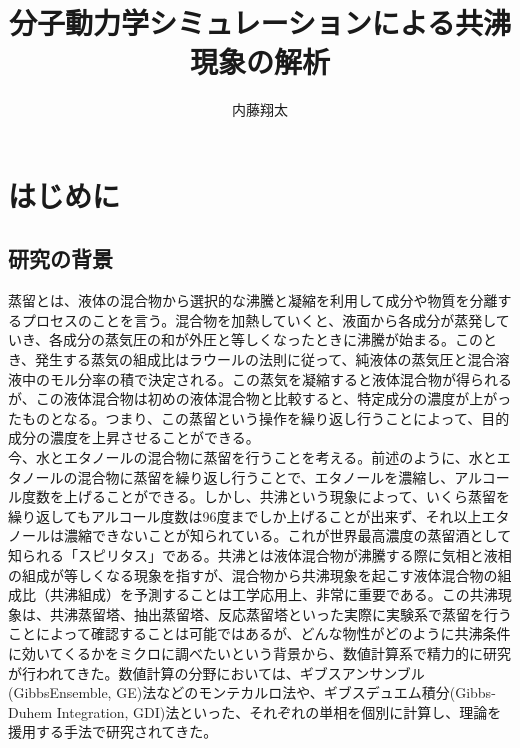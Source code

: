 \documentclass[titlepage]{jsreport}
\title{分子動力学シミュレーションによる共沸現象の解析}
\author{内藤翔太}
\begin{document}
\maketitle
{}

\tableofcontents
\pagestyle{plain}
\setcounter{page}{1}

\chapter{はじめに} \label{chap:introduction}


\section{研究の背景} \label{introduction:background}
蒸留とは、液体の混合物から選択的な沸騰と凝縮を利用して成分や物質を分離するプロセスのことを言う。混合物を加熱していくと、液面から各成分が蒸発していき、各成分の蒸気圧の和が外圧と等しくなったときに沸騰が始まる。このとき、発生する蒸気の組成比はラウールの法則に従って、純液体の蒸気圧と混合溶液中のモル分率の積で決定される。この蒸気を凝縮すると液体混合物が得られるが、この液体混合物は初めの液体混合物と比較すると、特定成分の濃度が上がったものとなる。つまり、この蒸留という操作を繰り返し行うことによって、目的成分の濃度を上昇させることができる。\\
今、水とエタノールの混合物に蒸留を行うことを考える。前述のように、水とエタノールの混合物に蒸留を繰り返し行うことで、エタノールを濃縮し、アルコール度数を上げることができる。しかし、共沸という現象によって、いくら蒸留を繰り返してもアルコール度数は96度までしか上げることが出来ず、それ以上エタノールは濃縮できないことが知られている。これが世界最高濃度の蒸留酒として知られる「スピリタス」である。共沸とは液体混合物が沸騰する際に気相と液相の組成が等しくなる現象を指すが、混合物から共沸現象を起こす液体混合物の組成比（共沸組成）を予測することは工学応用上、非常に重要である。この共沸現象は、共沸蒸留塔、抽出蒸留塔、反応蒸留塔といった実際に実験系で蒸留を行うことによって確認することは可能ではあるが、どんな物性がどのように共沸条件に効いてくるかをミクロに調べたいという背景から、数値計算系で精力的に研究が行われてきた。数値計算の分野においては、ギブスアンサンブル(GibbsEnsemble, GE)法などのモンテカルロ法や、ギブスデュエム積分(Gibbs-Duhem Integration, GDI)法といった、それぞれの単相を個別に計算し、理論を援用する手法で研究されてきた。
\end{document}
